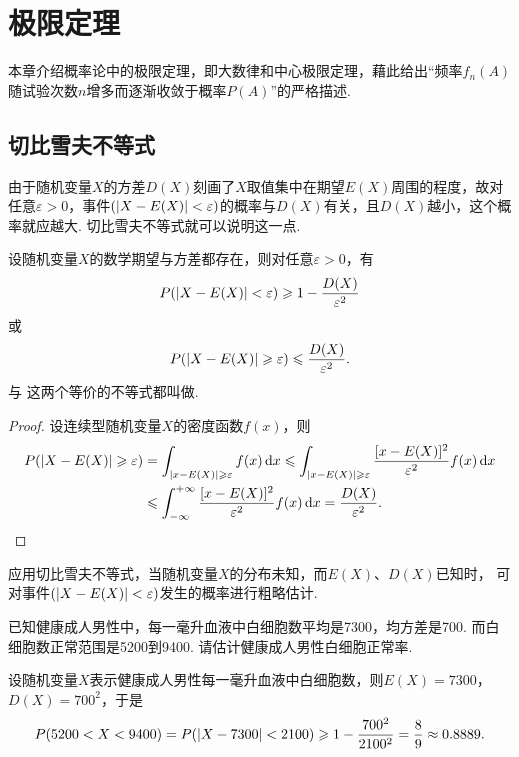 \chapter{极限定理}
本章介绍概率论中的极限定理，即大数律和中心极限定理，藉此给出“频率\(f_n(A)\)随试验次数\(n\)增多而逐渐收敛于概率\(P(A)\)”的严格描述.

\section{切比雪夫不等式}
由于随机变量\(X\)的方差\(D(X)\)刻画了\(X\)取值集中在期望\(E(X)\)周围的程度，故对任意\(\varepsilon>0\)，事件\((\abs{X - E(X)} < \varepsilon)\)的概率与\(D(X)\)有关，且\(D(X)\)越小，这个概率就应越大.
切比雪夫不等式就可以说明这一点.
\begin{theorem}[切比雪夫不等式]\label{theorem:极限定理.切比雪夫不等式}
设随机变量\(X\)的数学期望与方差都存在，则对任意\(\varepsilon > 0\)，有\begin{equation}\label{equation:极限定理.切比雪夫不等式1}
P(\abs{X-E(X)}<\varepsilon) \geqslant 1 - \frac{D(X)}{\varepsilon^2}
\end{equation}或\begin{equation}\label{equation:极限定理.切比雪夫不等式2}
P(\abs{X-E(X)}\geqslant\varepsilon) \leqslant \frac{D(X)}{\varepsilon^2}.
\end{equation}  与  这两个等价的不等式都叫做.
\begin{proof}
设连续型随机变量\(X\)的密度函数\(f(x)\)，则\begin{align*}
P(\abs{X-E(X)}\geqslant\varepsilon)
&=\int_{\abs{x-E(X)}\geqslant\varepsilon} f(x) \dd{x}
\leqslant \int_{\abs{x-E(X)}\geqslant\varepsilon} \frac{[x - E(X)]^2}{\varepsilon^2} f(x) \dd{x} \\
&\leqslant \int_{-\infty}^{+\infty} \frac{[x-E(X)]^2}{\varepsilon^2} f(x) \dd{x}
=\frac{D(X)}{\varepsilon^2}.
\qedhere
\end{align*}
\end{proof}
\end{theorem}

应用切比雪夫不等式，当随机变量\(X\)的分布未知，而\(E(X)\)、\(D(X)\)已知时，%
可对事件\((\abs{X-E(X)}<\varepsilon)\)发生的概率进行粗略估计.

\begin{example}
已知健康成人男性中，每一毫升血液中白细胞数平均是7300，均方差是700.
而白细胞数正常范围是5200到9400.
请估计健康成人男性白细胞正常率.
\begin{solution}
设随机变量\(X\)表示健康成人男性每一毫升血液中白细胞数，则\(E(X) = 7300\)，\(D(X) = 700^2\)，于是\[
P(5200 < X < 9400)
= P(\abs{X - 7300} < 2100)
\geqslant 1 - \frac{700^2}{2100^2} = \frac{8}{9}
\approx 0.8889.
\]
\end{solution}
\end{example}

